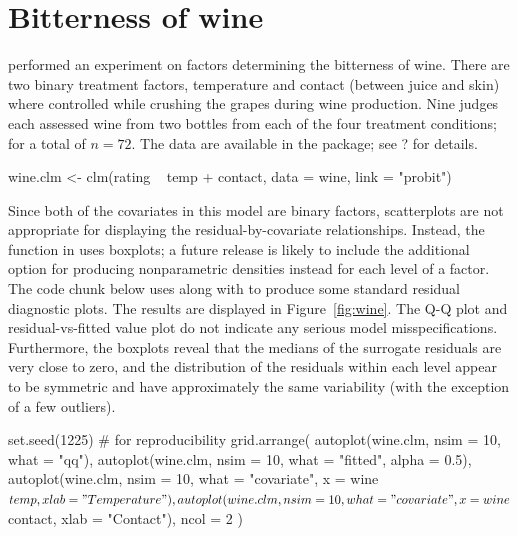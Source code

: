 \section{Bitterness of wine}

\citet{randal-analysis-1989} performed an experiment on factors determining the bitterness of wine. There are two binary treatment factors, temperature and contact (between juice and skin) where controlled while crushing the grapes during wine production. Nine judges each assessed wine from two bottles from each of the four treatment conditions; for a total of $n = 72$. The data are available in the  package; see ? for details.

\begin{example}
wine.clm <- clm(rating ~ temp + contact, data = wine, link = "probit")
\end{example}

Since both of the covariates in this model are binary factors, scatterplots are not appropriate for displaying the residual-by-covariate relationships. Instead, the  function in  uses boxplots; a future release is likely to include the additional option for producing nonparametric densities instead for each level of a factor. The code chunk below uses  along with  to produce some standard residual diagnostic plots. The results are displayed in Figure~\ref{fig:wine}. The Q-Q plot and residual-vs-fitted value plot do not indicate any serious model misspecifications. Furthermore, the boxplots reveal that the medians of the surrogate residuals are very close to zero, and the distribution of the residuals within each level appear to be symmetric and have approximately the same variability (with the exception of a few outliers).

\begin{example}
set.seed(1225)  # for reproducibility
grid.arrange(
  autoplot(wine.clm, nsim = 10, what = "qq"),
  autoplot(wine.clm, nsim = 10, what = "fitted", alpha = 0.5),
  autoplot(wine.clm, nsim = 10, what = "covariate", x = wine$temp, 
           xlab = "Temperature"),
  autoplot(wine.clm, nsim = 10, what = "covariate", x = wine$contact,
           xlab = "Contact"),
  ncol = 2
)
\end{example}

